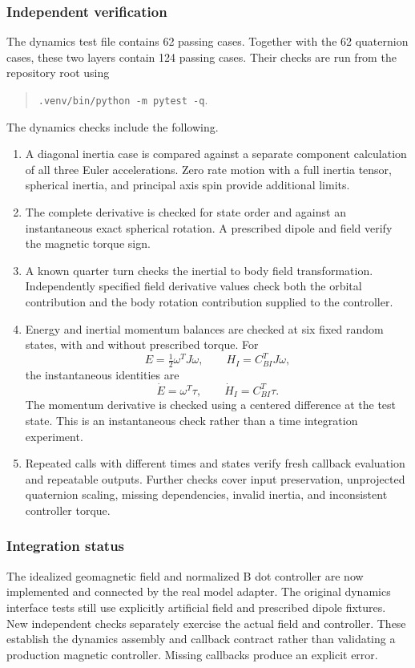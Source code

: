 \subsubsection{Independent verification}
The dynamics test file contains 62 passing cases. Together with the 62 quaternion cases, these two layers contain 124 passing cases. Their checks are run from the repository root using
\begin{quote}
\texttt{.venv/bin/python \string-m pytest \string-q}.
\end{quote}
The dynamics checks include the following.
\begin{enumerate}
\item A diagonal inertia case is compared against a separate component calculation of all three Euler accelerations. Zero rate motion with a full inertia tensor, spherical inertia, and principal axis spin provide additional limits.
\item The complete derivative is checked for state order and against an instantaneous exact spherical rotation. A prescribed dipole and field verify the magnetic torque sign.
\item A known quarter turn checks the inertial to body field transformation. Independently specified field derivative values check both the orbital contribution and the body rotation contribution supplied to the controller.
\item Energy and inertial momentum balances are checked at six fixed random states, with and without prescribed torque. For
\[
E=\tfrac12\omega^TJ\omega,
\qquad
H_I=C_{BI}^TJ\omega,
\]
the instantaneous identities are
\[
\dot E=\omega^T\tau,
\qquad
\dot H_I=C_{BI}^T\tau.
\]
The momentum derivative is checked using a centered difference at the test state. This is an instantaneous check rather than a time integration experiment.
\item Repeated calls with different times and states verify fresh callback evaluation and repeatable outputs. Further checks cover input preservation, unprojected quaternion scaling, missing dependencies, invalid inertia, and inconsistent controller torque.
\end{enumerate}

\subsubsection{Integration status}
The idealized geomagnetic field and normalized B dot controller are now implemented and connected by the real model adapter. The original dynamics interface tests still use explicitly artificial field and prescribed dipole fixtures. New independent checks separately exercise the actual field and controller. These establish the dynamics assembly and callback contract rather than validating a production magnetic controller. Missing callbacks produce an explicit error.

